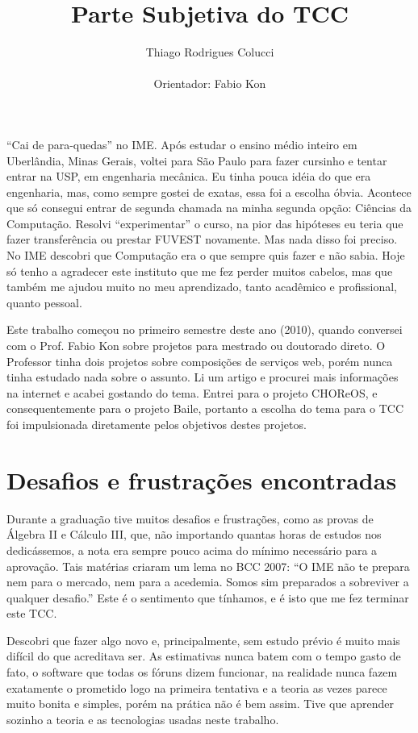 \documentclass[11pt,a4paper]{article}
\title{Parte Subjetiva do TCC}
\author{Thiago Rodrigues Colucci\\\\Orientador: Fabio Kon}
\begin{document}
\maketitle

\newpage

``Cai de para-quedas'' no IME. Após estudar o ensino médio inteiro em Uberlândia, Minas Gerais, voltei para São Paulo para fazer cursinho e tentar entrar na USP, em engenharia mecânica. Eu tinha pouca idéia do que era engenharia, mas, como sempre gostei de exatas, essa foi a escolha óbvia. Acontece que só consegui entrar de segunda chamada na minha segunda opção: Ciências da Computação. Resolvi ``experimentar'' o curso, na pior das hipóteses eu teria que fazer transferência ou prestar FUVEST novamente. Mas nada disso foi preciso. No IME descobri que Computação era o que sempre quis fazer e não sabia. Hoje só tenho a agradecer este instituto que me fez perder muitos cabelos, mas que também me ajudou muito no meu aprendizado, tanto acadêmico e profissional, quanto pessoal.

Este trabalho começou no primeiro semestre deste ano (2010), quando conversei com o Prof. Fabio Kon sobre projetos para mestrado ou doutorado direto. O Professor tinha dois projetos sobre composições de serviços web, porém nunca tinha estudado nada sobre o assunto. Li um artigo e procurei mais informações na internet e acabei gostando do tema. Entrei para o projeto CHOReOS, e consequentemente para o projeto Baile, portanto a escolha do tema para o TCC foi impulsionada diretamente pelos objetivos destes projetos.





\section{ Desafios e frustrações encontradas}
Durante a graduação tive muitos desafios e frustrações, como as provas de Álgebra II e Cálculo III, que, não importando quantas horas de estudos nos dedicássemos, a nota era sempre pouco acima do mínimo necessário para a aprovação. Tais matérias criaram um lema no BCC 2007: ``O IME não te prepara nem para o mercado, nem para a acedemia. Somos sim preparados a sobreviver a qualquer desafio.'' Este é o sentimento que tínhamos, e é isto que me fez terminar este TCC. 

Descobri que fazer algo novo e, principalmente, sem estudo prévio é muito mais difícil do que acreditava ser. As estimativas nunca batem com o tempo gasto de fato, o software que todas os fóruns dizem funcionar, na realidade nunca fazem exatamente o prometido logo na primeira tentativa e a teoria as vezes parece muito bonita e simples, porém na prática não é bem assim. Tive que aprender sozinho a teoria e as tecnologias usadas neste trabalho.
\end{document}

